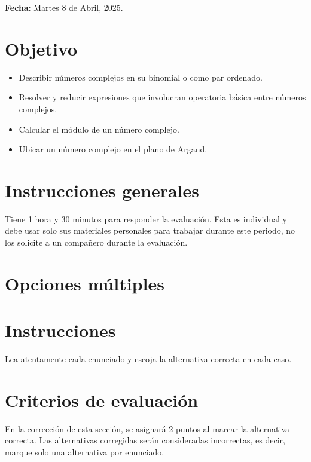 \documentclass[]{srs}
\begin{document}
\hfill\textbf{Fecha}: Martes 8 de Abril, 2025.\vspace*{-15pt}
\section*{Objetivo}

\begin{itemize}[nosep]
  \item Describir números complejos en su binomial o como par ordenado.
  \item Resolver y reducir expresiones que involucran operatoria básica entre números complejos.
  \item Calcular el módulo de un número complejo.
  \item Ubicar un número complejo en el plano de Argand.
\end{itemize}

\section*{Instrucciones generales}
  Tiene 1 hora y 30 minutos para responder la evaluación. Esta es individual y debe
  usar solo sus materiales personales para trabajar durante este periodo, no los solicite
  a un compañero durante la evaluación.

\section{Opciones múltiples}

\section*{Instrucciones}
Lea atentamente cada enunciado y escoja la alternativa correcta en cada caso.

\section*{Criterios de evaluación}
En la corrección de esta sección, se asignará 2 puntos al marcar la alternativa correcta.
Las alternativas corregidas serán consideradas incorrectas, es decir, marque solo una
alternativa por enunciado.

\separador[2mm]
\end{document}
